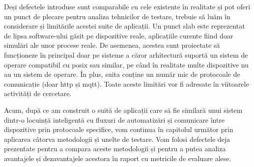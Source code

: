Deși defectele introduse sunt comparabile cu cele existente în realitate și pot oferi un punct de plecare pentru analiza tehnicilor de testare, trebuie să luăm în considerare și limitările acestei suite de aplicații. Un punct slab este reprezentat de lipsa software-ului găsit pe dispozitive reale, aplicațiile curente fiind doar simulări ale unor procese reale. De asemenea, acestea sunt proiectate să funcționeze în principal doar pe sisteme a căror arhitectură suportă un sistem de operare compatibil cu \acrfull{posix} sau similar, pe când în realitate multe dispozitive nu au un sistem de operare. În plus, suita conține un număr mic de protocoale de comunicație (doar \acrshort{http} și \acrshort{mqtt}). Toate aceste limitări vor fi adresate în viitoarele activități de cercetare.

Acum, după ce am construit o suită de aplicații care să fie similară unui sistem dintr-o locuință inteligentă cu fluxuri de automatizări și comunicare între dispozitive prin protocoale specifice, vom continua în capitolul următor prin aplicarea câtorva metodologii și unelte de testare. Vom folosi defectele deja prezentate pentru a compara aceste metodologii și pentru a putea analiza avantajele și dezavantajele acestora în raport cu metricile de evaluare alese.